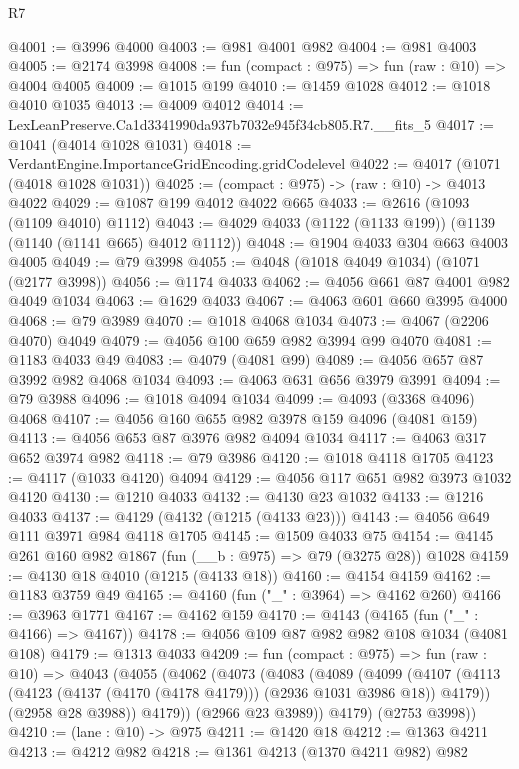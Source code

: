 \begin{lexlean}{R7}
\begin{coremodule}
@4001 := @3996 @4000
@4003 := @981 @4001 @982
@4004 := @981 @4003
@4005 := @2174 @3998
@4008 := fun (compact : @975) => fun (raw : @10) => @4004 @4005
@4009 := @1015 @199
@4010 := @1459 @1028
@4012 := @1018 @4010 @1035
@4013 := @4009 @4012
@4014 := LexLeanPreserve.Ca1d3341990da937b7032e945f34cb805.R7.__fits_5
@4017 := @1041 (@4014 @1028 @1031)
@4018 := VerdantEngine.ImportanceGridEncoding.gridCodelevel
@4022 := @4017 (@1071 (@4018 @1028 @1031))
@4025 := (compact : @975) -> (raw : @10) -> @4013 @4022
@4029 := @1087 @199 @4012 @4022 @665
@4033 := @2616 (@1093 (@1109 @4010) @1112)
@4043 := @4029 @4033 (@1122 (@1133 @199)) (@1139 (@1140 (@1141 @665) @4012 @1112))
@4048 := @1904 @4033 @304 @663 @4003 @4005
@4049 := @79 @3998
@4055 := @4048 (@1018 @4049 @1034) (@1071 (@2177 @3998))
@4056 := @1174 @4033
@4062 := @4056 @661 @87 @4001 @982 @4049 @1034
@4063 := @1629 @4033
@4067 := @4063 @601 @660 @3995 @4000
@4068 := @79 @3989
@4070 := @1018 @4068 @1034
@4073 := @4067 (@2206 @4070) @4049
@4079 := @4056 @100 @659 @982 @3994 @99 @4070
@4081 := @1183 @4033 @49
@4083 := @4079 (@4081 @99)
@4089 := @4056 @657 @87 @3992 @982 @4068 @1034
@4093 := @4063 @631 @656 @3979 @3991
@4094 := @79 @3988
@4096 := @1018 @4094 @1034
@4099 := @4093 (@3368 @4096) @4068
@4107 := @4056 @160 @655 @982 @3978 @159 @4096 (@4081 @159)
@4113 := @4056 @653 @87 @3976 @982 @4094 @1034
@4117 := @4063 @317 @652 @3974 @982
@4118 := @79 @3986
@4120 := @1018 @4118 @1705
@4123 := @4117 (@1033 @4120) @4094
@4129 := @4056 @117 @651 @982 @3973 @1032 @4120
@4130 := @1210 @4033
@4132 := @4130 @23 @1032
@4133 := @1216 @4033
@4137 := @4129 (@4132 (@1215 (@4133 @23)))
@4143 := @4056 @649 @111 @3971 @984 @4118 @1705
@4145 := @1509 @4033 @75
@4154 := @4145 @261 @160 @982 @1867 (fun (__b : @975) => @79 (@3275 @28)) @1028
@4159 := @4130 @18 @4010 (@1215 (@4133 @18))
@4160 := @4154 @4159
@4162 := @1183 @3759 @49
@4165 := @4160 (fun ("_" : @3964) => @4162 @260)
@4166 := @3963 @1771
@4167 := @4162 @159
@4170 := @4143 (@4165 (fun ("_" : @4166) => @4167))
@4178 := @4056 @109 @87 @982 @982 @108 @1034 (@4081 @108)
@4179 := @1313 @4033
@4209 := fun (compact : @975) =>
  fun (raw : @10) =>
  @4043
    (@4055
      (@4062
        (@4073
          (@4083
            (@4089
              (@4099
                (@4107 (@4113 (@4123 (@4137 (@4170 (@4178 @4179))) (@2936 @1031 @3986 @18)) @4179))
                (@2958 @28 @3988))
              @4179))
          (@2966 @23 @3989))
        @4179)
      (@2753 @3998))
@4210 := (lane : @10) -> @975
@4211 := @1420 @18
@4212 := @1363 @4211
@4213 := @4212 @982
@4218 := @1361 @4213 (@1370 @4211 @982) @982

\end{coremodule}
\end{lexlean}
